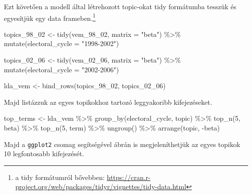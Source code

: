 \documentclass[
]{book}
\newenvironment{Shaded}{\begin{snugshade}}{\end{snugshade}}
\newcommand{\AttributeTok}[1]{\textcolor[rgb]{0.77,0.63,0.00}{#1}}
\newcommand{\DecValTok}[1]{\textcolor[rgb]{0.00,0.00,0.81}{#1}}
\newcommand{\FunctionTok}[1]{\textcolor[rgb]{0.00,0.00,0.00}{#1}}
\newcommand{\NormalTok}[1]{#1}
\newcommand{\OtherTok}[1]{\textcolor[rgb]{0.56,0.35,0.01}{#1}}
\newcommand{\SpecialCharTok}[1]{\textcolor[rgb]{0.00,0.00,0.00}{#1}}
\newcommand{\StringTok}[1]{\textcolor[rgb]{0.31,0.60,0.02}{#1}}
\begin{document}
Ezt követően a modell által létrehozott topic-okat tidy formátumba
tesszük és egyesítjük egy data frameben.\footnote{a tidy formátumról
  bővebben:
  \url{https://cran.r-project.org/web/packages/tidyr/vignettes/tidy-data.html}}

\begin{Shaded}
\begin{Highlighting}[]
\NormalTok{topics\_98\_02 }\OtherTok{\textless{}{-}} \FunctionTok{tidy}\NormalTok{(vem\_98\_02, }\AttributeTok{matrix =} \StringTok{"beta"}\NormalTok{) }\SpecialCharTok{\%\textgreater{}\%}
  \FunctionTok{mutate}\NormalTok{(}\AttributeTok{electoral\_cycle =} \StringTok{"1998{-}2002"}\NormalTok{)}

\NormalTok{topics\_02\_06 }\OtherTok{\textless{}{-}} \FunctionTok{tidy}\NormalTok{(vem\_02\_06, }\AttributeTok{matrix =} \StringTok{"beta"}\NormalTok{) }\SpecialCharTok{\%\textgreater{}\%}
  \FunctionTok{mutate}\NormalTok{(}\AttributeTok{electoral\_cycle =} \StringTok{"2002{-}2006"}\NormalTok{)}

\NormalTok{lda\_vem }\OtherTok{\textless{}{-}} \FunctionTok{bind\_rows}\NormalTok{(topics\_98\_02, topics\_02\_06)}
\end{Highlighting}
\end{Shaded}

Majd listázzuk az egyes topikokhoz tartozó leggyakoribb kifejezéseket.

\begin{Shaded}
\begin{Highlighting}[]

\NormalTok{top\_terms }\OtherTok{\textless{}{-}}\NormalTok{ lda\_vem }\SpecialCharTok{\%\textgreater{}\%}
  \FunctionTok{group\_by}\NormalTok{(electoral\_cycle, topic) }\SpecialCharTok{\%\textgreater{}\%}
  \FunctionTok{top\_n}\NormalTok{(}\DecValTok{5}\NormalTok{, beta) }\SpecialCharTok{\%\textgreater{}\%}
  \FunctionTok{top\_n}\NormalTok{(}\DecValTok{5}\NormalTok{, term) }\SpecialCharTok{\%\textgreater{}\%}
  \FunctionTok{ungroup}\NormalTok{() }\SpecialCharTok{\%\textgreater{}\%}
  \FunctionTok{arrange}\NormalTok{(topic, }\SpecialCharTok{{-}}\NormalTok{beta)}
\end{Highlighting}
\end{Shaded}

Majd a \texttt{ggplot2} csomag segítségével ábrán is megjeleníthetjük az
egyes topikok 10 legfontosabb kifejezését.
\end{document}

